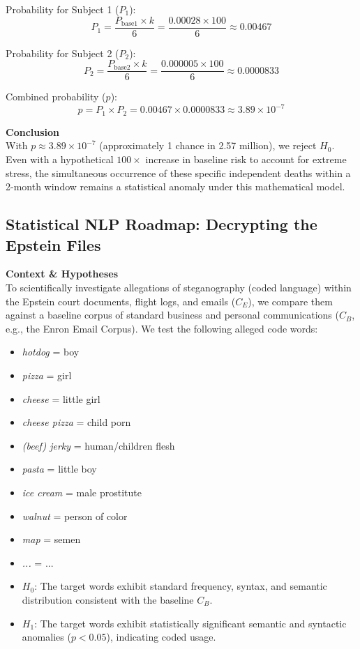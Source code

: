 \documentclass[11pt,a4paper]{article}
\theoremstyle{definition}
\theoremstyle{remark}
\begin{document}
Probability for Subject 1 ($P_1$):
$$ P_1 = \frac{P_{\text{base1}} \times k}{6} = \frac{0.00028 \times 100}{6} \approx 0.00467 $$

Probability for Subject 2 ($P_2$):
$$ P_2 = \frac{P_{\text{base2}} \times k}{6} = \frac{0.000005 \times 100}{6} \approx 0.0000833 $$

Combined probability ($p$):
$$ p = P_1 \times P_2 = 0.00467 \times 0.0000833 \approx 3.89 \times 10^{-7} $$

\textbf{Conclusion}\\
With $p \approx 3.89 \times 10^{-7}$ (approximately 1 chance in 2.57 million), we reject $H_0$. Even with a hypothetical $100\times$ increase in baseline risk to account for extreme stress, the simultaneous occurrence of these specific independent deaths within a 2-month window remains a statistical anomaly under this mathematical model.

\subsection*{Statistical NLP Roadmap: Decrypting the Epstein Files}

\textbf{Context \& Hypotheses}\\
To scientifically investigate allegations of steganography (coded language) within the Epstein court documents, flight logs, and emails ($C_E$), we compare them against a baseline corpus of standard business and personal communications ($C_B$, e.g., the Enron Email Corpus). We test the following alleged code words:
\begin{itemize}
    \item \textit{hotdog} = boy
    \item \textit{pizza} = girl
    \item \textit{cheese} = little girl
    \item \textit{cheese pizza} = child porn
    \item \textit{(beef) jerky} = human/children flesh
    \item \textit{pasta} = little boy
    \item \textit{ice cream} = male prostitute
    \item \textit{walnut} = person of color
    \item \textit{map} = semen
    \item \textit{...} = ...
\end{itemize}

\begin{itemize}
    \item $H_0$: The target words exhibit standard frequency, syntax, and semantic distribution consistent with the baseline $C_B$.
    \item $H_1$: The target words exhibit statistically significant semantic and syntactic anomalies ($p < 0.05$), indicating coded usage.
\end{itemize}
\end{document}
